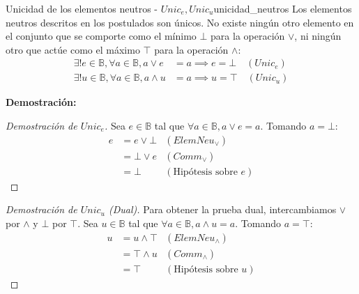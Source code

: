 \documentclass[12pt,a4paper]{article}
\newcommand{\desplegable}[2]{%
  \par\vspace{1ex}\noindent
  \textbf{Demostración:}
  \vspace{1ex}
  
  #2
  \par\vspace{1ex}
}
\begin{document}
\begin{teorema}{Unicidad de los elementos neutros - $Unic_e, Unic_u$}{unicidad_neutros}
Los elementos neutros descritos en los postulados son únicos. No existe ningún otro elemento en el conjunto que se comporte como el mínimo $\bot$ para la operación $\vee$, ni ningún otro que actúe como el máximo $\top$ para la operación $\wedge$:
\begin{align*}
    \exists! e \in \mathbb{B}, \forall a \in \mathbb{B}, a \vee e &= a \implies e = \bot \quad (Unic_e) \\
    \exists! u \in \mathbb{B}, \forall a \in \mathbb{B}, a \wedge u &= a \implies u = \top \quad (Unic_u)
\end{align*}
\end{teorema}
\desplegable{proof_unic}{
\begin{proof}[Demostración de $Unic_e$]
Sea $e \in \mathbb{B}$ tal que $\forall a \in \mathbb{B}, a \vee e = a$. Tomando $a = \bot$:
\begin{align*}
    e &= e \vee \bot & (ElemNeu_\vee) \\
      &= \bot \vee e & (Comm_\vee) \\
      &= \bot & (\text{Hipótesis sobre } e)
\end{align*}
\end{proof}
\begin{proof}[Demostración de $Unic_u$ (Dual)]
Para obtener la prueba dual, intercambiamos $\vee$ por $\wedge$ y $\bot$ por $\top$.
Sea $u \in \mathbb{B}$ tal que $\forall a \in \mathbb{B}, a \wedge u = a$. Tomando $a = \top$:
\begin{align*}
    u &= u \wedge \top & (ElemNeu_\wedge) \\
      &= \top \wedge u & (Comm_\wedge) \\
      &= \top & (\text{Hipótesis sobre } u)
\end{align*}
\end{proof}
}
\end{document}
